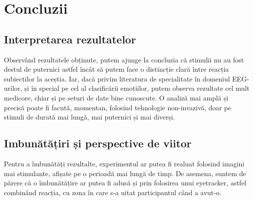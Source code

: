 \chapter{Concluzii}

\section{Interpretarea rezultatelor}

Observând rezultatele obținute, putem ajunge la concluzia că stimulii nu au fost destul de puternici astfel încât să putem face o distincție clară între reacția subiecților la aceștia. Iar, dacă privim literatura de specialitate în domeniul EEG-urilor, și în special pe cel al clasificării emoțiilor, putem observa rezultate cel mult medicore\cite{recreation_attempt}, chiar și pe seturi de date bine cunoscute. O analiză mai amplă și precisă poate fi facută, momentan, folosind tehnologie non-invazivă, doar pe stimuli de durată mai lungă, mai puternici și mai diverși.

\section{Imbunătățiri și perspective de viitor}

Pentru a îmbunătăți rezultalte, experimentul ar putea fi realuat folosind imagini mai stimulante, afișate pe o perioadă mai lungă de timp. De asemena, suntem de părere că o îmbunătățire ar putea fi adusă și prin folosirea unui eyetracker, astfel combinând reacția, cu zona în care s-a uitat participantul când a avut-o.